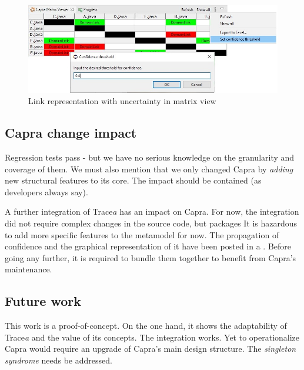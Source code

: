 \begin{figure}[h]  
	\centering
	\includegraphics[width=.85\linewidth]{images/matrixViewerExt.JPG}
	\caption{Link representation with uncertainty in matrix view}
	\label{fig:matrixext}
\end{figure}



\subsection{Capra change impact}
Regression tests pass - but we have no serious knowledge on the granularity and coverage of them. We must also mention that we only changed Capra by \textit{adding} new structural features to its core. The impact should be contained (as developers always say).

A further integration of Trace\textit{a} has an impact on Capra. For now, the integration did not require complex changes in the source code, but packages  It is hazardous to add more specific features to the metamodel for now. The propagation of confidence and the graphical representation of it have been posted in a . Before going any further, it is required to bundle them together to benefit from Capra's maintenance.

\subsection{Future work}
This work is a proof-of-concept. On the one hand, it shows the adaptability of Trace\textit{a} and the value of its concepts. The integration works.   
Yet to operationalize Capra would require an upgrade of Capra's main design structure. The \textit{singleton syndrome} needs be addressed.  
